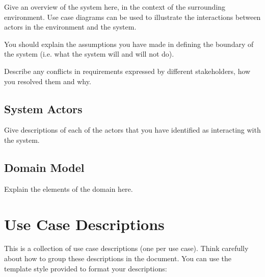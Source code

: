 \documentclass{l3deliverable}
\begin{document}
Give an overview of the system here, in the context of the surrounding
environment.  Use case diagrams can be used to illustrate the
interactions between actors in the environment and the system.

You should explain the assumptions you have made in defining the
boundary of the system (i.e. what the system will and will not do).

Describe any conflicts in requirements expressed by different
stakeholders, how you resolved them and why.


\subsection{System Actors}

Give descriptions of each of the actors that you have identified as
interacting with the system.


\subsection{Domain Model}

Explain the elements of the domain here.


\section{Use Case Descriptions}

This is a collection of use case descriptions (one per use case).
Think carefully about how to group these descriptions in the document.
You can use the template style provided to format your descriptions:

\begin{UseCaseTemplate}
\UseCaseLabel{}
\UseCaseDescription{}
\UseCaseRationale{}
\UseCasePriority{}
\UseCaseStatus{}
\UseCaseActors{}
\UseCaseExtensions{}
\UseCaseIncludes{}
\UseCaseConditions{}
\UseCaseNonFunctionalRequirements{}
\UseCaseScenarios{}
\UseCaseRisks{}
\UseCaseUserInterface{}
\end{UseCaseTemplate}

\end{document}
